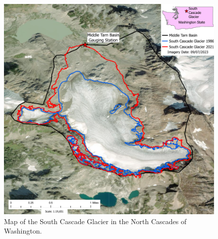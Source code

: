 \documentclass{article}
\begin{document}
\begin{figure}[h!]
    \centering
    \includegraphics[width=\textwidth]{Plots/SouthCascadeGlacierMap.pdf}
    \caption{Map of the South Cascade Glacier in the North Cascades of Washington.}
    \label{fig:south_cascade_glacier}
\end{figure}
\FloatBarrier
\end{document}
